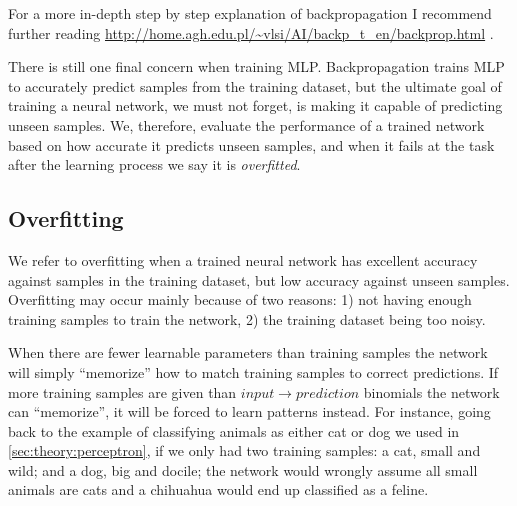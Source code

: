 

For a more in-depth step by step explanation of backpropagation I recommend further reading \url{http://home.agh.edu.pl/~vlsi/AI/backp_t_en/backprop.html} \cite{Bernacki2005}.

There is still one final concern when training MLP.
Backpropagation trains MLP to accurately predict samples from the training dataset, but the ultimate goal of training a neural network, we must not forget, is making it capable of predicting unseen samples.
We, therefore, evaluate the performance of a trained network based on how accurate it predicts unseen samples, and when it fails at the task after the learning process we say it is \emph{overfitted}.


\subsection{Overfitting}
\label{sec:theory:mlp:overfitting}

We refer to overfitting when a trained neural network has excellent accuracy against samples in the training dataset, but low accuracy against unseen samples.
Overfitting may occur mainly because of two reasons: 1) not having enough training samples to train the network, 2) the training dataset being too noisy.

When there are fewer learnable parameters than training samples the network will simply ``memorize'' how to match training samples to correct predictions.
If more training samples are given than $input \rightarrow prediction$ binomials the network can ``memorize'', it will be forced to learn patterns instead.
For instance, going back to the example of classifying animals as either cat or dog we used in \autoref{sec:theory:perceptron}, if we only had two training samples: a cat, small and wild; and a dog, big and docile; the network would wrongly assume all small animals are cats and a chihuahua would end up classified as a feline.

